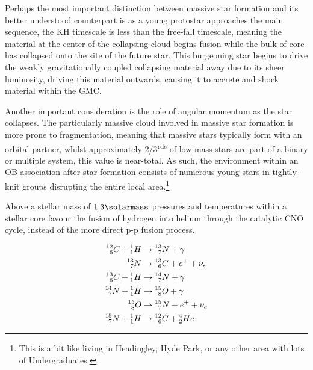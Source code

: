 Perhaps the most important distinction between massive star formation and its better understood counterpart is as a young protostar approaches the main sequence, the KH timescale is less than the free-fall timescale, meaning the material at the center of the collapsing cloud begins fusion while the bulk of core has collapsed onto the site of the future star. This burgeoning star begins to drive the weakly gravitationally coupled collapsing material away due to its sheer luminosity, driving this material outwards, causing it to accrete and shock material within the GMC. 

Another important consideration is the role of angular momentum as the star collapses.
The particularly massive cloud involved in massive star formation is more prone to fragmentation, meaning that massive stars typically form with an orbital partner, whilst approximately 2/3\textsuperscript{rds} of low-mass stars are part of a binary or multiple system, this value is near-total.
As such, the environment within an OB association after star formation consists of numerous young stars in tightly-knit groups disrupting the entire local area.\footnote{This is a bit like living in Headingley, Hyde Park, or any other area with lots of Undergraduates.}


Above a stellar mass of $1.3 \si{\solarmass}$ pressures and temperatures within a stellar core favour the fusion of hydrogen into helium through the catalytic CNO cycle, instead of the more direct p-p fusion process. 

\begin{subequations}
  \begin{align*}
    \prescript{12}{6}{C} + \prescript{1}{1}{H} & \rightarrow \prescript{13}{7}{N} + \gamma \\ 
    \prescript{13}{7}{N} & \rightarrow \prescript{13}{6}{C} + e^+ + \nu_e \\
    \prescript{13}{6}{C} + \prescript{1}{1}{H} & \rightarrow \prescript{14}{7}{N} + \gamma \\
    \prescript{14}{7}{N} + \prescript{1}{1}{H} & \rightarrow \prescript{15}{8}{O} + \gamma \\
    \prescript{15}{8}{O} & \rightarrow \prescript{15}{7}{N} + e^+ + \nu_e \\
    \prescript{15}{7}{N} + \prescript{1}{1}{H} & \rightarrow \prescript{12}{6}{C} + \prescript{4}{2}{He} 
  \end{align*}
\end{subequations}


